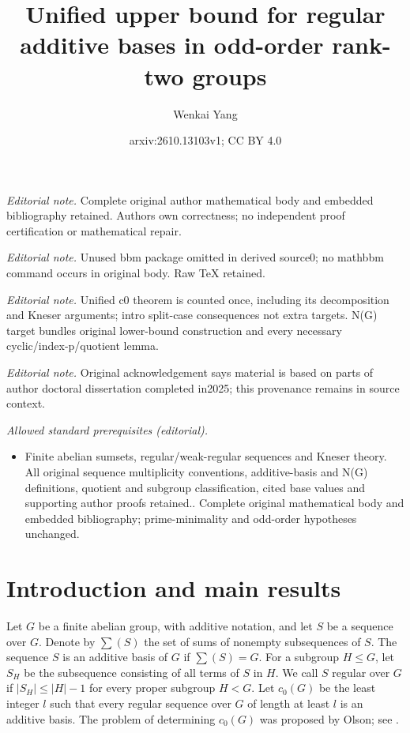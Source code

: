 \documentclass[10pt,a4paper]{amsart}
\title{Unified upper bound for regular additive bases in odd-order rank-two groups}
\author{Wenkai Yang}
\date{arxiv:2610.13103v1; CC BY 4.0}
\theoremstyle{definition}
\theoremstyle{remark}
\numberwithin{equation}{section}
\begin{document}
\maketitle
\noindent\textit{Editorial note.} Complete original author mathematical body and embedded bibliography retained. Authors own correctness; no independent proof certification or mathematical repair.\par\medskip
\noindent\textit{Editorial note.} Unused bbm package omitted in derived source0; no mathbbm command occurs in original body. Raw TeX retained.\par\medskip
\noindent\textit{Editorial note.} Unified c0 theorem is counted once, including its decomposition and Kneser arguments; intro split-case consequences not extra targets. N(G) target bundles original lower-bound construction and every necessary cyclic/index-p/quotient lemma.\par\medskip
\noindent\textit{Editorial note.} Original acknowledgement says material is based on parts of author doctoral dissertation completed in2025; this provenance remains in source context.\par\medskip
\noindent\textit{Allowed standard prerequisites (editorial).}\begin{itemize}
\item Finite abelian sumsets, regular/weak-regular sequences and Kneser theory. All original sequence multiplicity conventions, additive-basis and N(G) definitions, quotient and subgroup classification, cited base values and supporting author proofs retained.. Complete original mathematical body and embedded bibliography; prime-minimality and odd-order hypotheses unchanged.
\end{itemize}\medskip
\section{Introduction and main results}

Let $G$ be a finite abelian group, with additive notation, and let $S$ be
a sequence over $G$. Denote by $\sum(S)$ the set of sums of nonempty
subsequences of $S$. The sequence $S$ is an additive basis of $G$ if
$\sum(S)=G$. For a subgroup $H\le G$, let $S_H$ be the subsequence
consisting of all terms of $S$ in $H$. We call $S$ regular over $G$ if
$|S_H|\le |H|-1$ for every proper subgroup $H<G$.
Let $c_0(G)$ be the least integer $l$ such that every regular sequence
over $G$ of length at least $l$ is an additive basis.
The problem of determining $c_0(G)$ was proposed by Olson;
see \cite{[GHQQZ2015],[GQZ2020]}.
\end{document}
